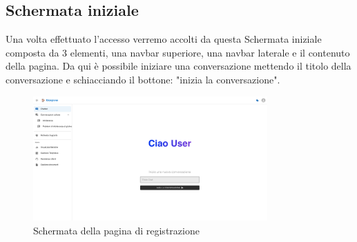 \subsection{Schermata iniziale}
Una volta effettuato l'accesso verremo accolti da questa Schermata iniziale composta da 3 elementi, una navbar superiore, una navbar laterale e il contenuto della pagina. Da qui è possibile iniziare una conversazione mettendo il titolo della conversazione e schiacciando il bottone: "inizia la conversazione".
\begin{figure}[h!]
    \centering
    \includegraphics[width=0.8\textwidth]{./img/paginaIniziale.png}
    \caption{Schermata della pagina di registrazione}
\end{figure}
